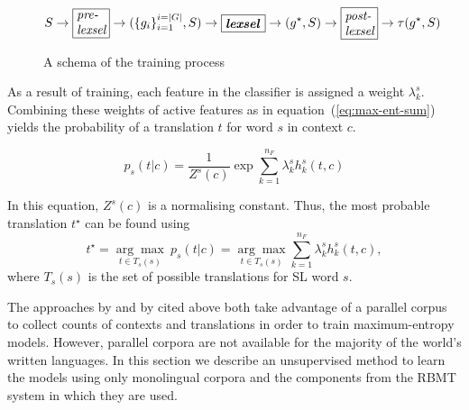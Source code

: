 \documentclass[11pt]{article}
\begin{document}
\begin{figure*}
\begin{displaymath}
  \label{eq:steps}
  S \to \mbox{\framebox{\parbox{0.8cm}{\textit{pre- lexsel}}}} \to (\{g_i\}_{i=1}^{i=|G|},S) \to \mbox{\framebox{\parbox{1.0cm}{\textit{\textbf{lexsel}}}}} \to (g^\star,S) \to \mbox{\framebox{\parbox{0.8cm}{\textit{post- lexsel}}}} \to \tau(g^\star,S)
\end{displaymath}
 \caption{A schema of the training process}
 \label{fig:lexselschema}
\end{figure*}


As a result of training, each feature in the classifier is assigned a
weight $\lambda_k^s$. Combining these weights of active features
as in equation~(\ref{eq:max-ent-sum}) yields the probability of a
translation $t$ for word $s$ in context $c$.

\begin{equation}
p_s(t|c) = \frac{1}{Z^s(c)} \exp{ \sum_{k=1}^{n_F} \lambda_k^s h_k^s(t, c)}
\label{eq:max-ent-sum}
\end{equation}

In this equation, $Z^s(c)$ is a normalising constant. Thus, the most
probable translation \(t^\star\) can be found using
\begin{equation}
  t^\star=\underset{t \in T_s(s)}{\arg\max} ~ p_s(t|c) = \underset{t \in T_s(s)}{\arg\max} \sum_{k=1}^{n_F} \lambda_k^s h_k^s(t, c) ,
\label{eq:max-ent-max}
\end{equation}
where $T_s(s)$ is the set of possible translations for SL word $s$.

The approaches by \cite{berger1996} and by \cite{marechek10} cited
above both take advantage of a parallel corpus to collect counts of
contexts and translations in order to train maximum-entropy
models. However, parallel corpora are not available for the majority
of the world's written languages. In this section we describe an
unsupervised method to learn the models using only monolingual corpora
and the components from the RBMT system in which they are
used. 
\end{document}

